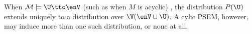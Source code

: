%
{%
    When $\mathcal M \models \U \tto \enV$ 
    (such as when $M$ is acyclic)%
    ,
    the distribution
    $P(\U)$
    extends uniquely to a distribution over $\V(\enV \cup \U)$.    
}%
A cylic PSEM, however, may induce more than one such distribution, or none at all.
%
